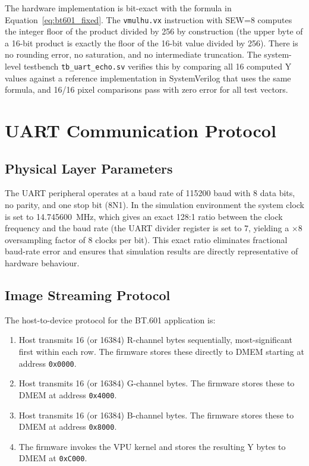 The hardware implementation is bit-exact with the formula in Equation~\ref{eq:bt601_fixed}.
The \texttt{vmulhu.vx} instruction with SEW=8 computes the integer floor of the product
divided by 256 by construction (the upper byte of a 16-bit product is exactly the floor
of the 16-bit value divided by 256). There is no rounding error, no saturation, and no
intermediate truncation. The system-level testbench \texttt{tb\_uart\_echo.sv} verifies
this by comparing all 16 computed Y values against a reference implementation in
SystemVerilog that uses the same formula, and 16/16 pixel comparisons pass with zero
error for all test vectors.

\section{UART Communication Protocol}
\label{sec:uart_protocol}

\subsection{Physical Layer Parameters}

The UART peripheral operates at a baud rate of 115200 baud with 8 data bits, no parity,
and one stop bit (8N1). In the simulation environment the system clock is set to
14.745600~MHz, which gives an exact 128:1 ratio between the clock frequency and the
baud rate (the UART divider register is set to 7, yielding a $\times$8 oversampling
factor of 8 clocks per bit). This exact ratio eliminates fractional baud-rate error
and ensures that simulation results are directly representative of hardware behaviour.

\subsection{Image Streaming Protocol}

The host-to-device protocol for the BT.601 application is:

\begin{enumerate}
  \item Host transmits 16 (or 16384) R-channel bytes sequentially, most-significant
        first within each row. The firmware stores these directly to DMEM starting at
        address \texttt{0x0000}.
  \item Host transmits 16 (or 16384) G-channel bytes. The firmware stores these to DMEM
        at address \texttt{0x4000}.
  \item Host transmits 16 (or 16384) B-channel bytes. The firmware stores these to DMEM
        at address \texttt{0x8000}.
  \item The firmware invokes the VPU kernel and stores the resulting Y bytes to DMEM at
        \texttt{0xC000}.
\end{enumerate}

